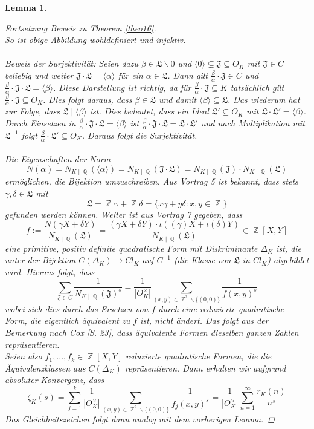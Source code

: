 \documentclass[10pt,a4paper]{article}
\theoremstyle{plain}
\newtheorem{lem}[thm]{Lemma}
\theoremstyle{definition}
\theoremstyle{remark}
\DeclareMathOperator{\Q}{\mathbb{Q}}
\DeclareMathOperator{\Z}{\mathbb{Z}}
\begin{document}
\begin{lem}
\begin{proof}[Fortsetzung Beweis zu Theorem \ref{theo16}]
\\
So ist obige Abbildung wohldefiniert und injektiv.\\
\\
Beweis der Surjektivität:
Seien dazu $\beta \in \mathfrak{L}\backslash{0}$ und  $\langle 0 \rangle \subsetneq \mathfrak{J} \subseteq O_K$ mit $\mathfrak{J} \in C$ beliebig und weiter $\mathfrak{J\cdot L}= \langle \alpha \rangle$ für ein $\alpha \in \mathfrak{L}$. Dann gilt $\frac{\beta}{\alpha} \cdot \mathfrak{J} \in C$ und $\frac{\beta}{\alpha} \cdot \mathfrak{J\cdot L} = \langle \beta\rangle$. Diese Darstellung ist richtig, da für $\frac{\beta}{\alpha} \cdot \mathfrak{J} \subseteq K$ tatsächlich gilt $\frac{\beta}{\alpha} \cdot \mathfrak{J} \subseteq O_K$. Dies folgt daraus, dass $\beta \in \mathfrak{L}$ und damit $\langle \beta \rangle \subseteq \mathfrak{L}$. Das wiederum hat zur Folge, dass $\mathfrak{L}\mid \langle \beta \rangle$ ist. Dies bedeutet, dass ein Ideal $\mathfrak{L'}\subseteq O_K$ mit $\mathfrak{L\cdot L'}= \langle \beta \rangle$. Durch Einsetzen in $\frac{\beta}{\alpha} \cdot \mathfrak{J\cdot L} = \langle \beta\rangle$ ist $\frac{\beta}{\alpha} \cdot \mathfrak{J\cdot L} = \mathfrak{L \cdot L'} $ und nach Multiplikation mit $\mathfrak{L^{-1}}$ folgt $\frac{\beta}{\alpha} \cdot \mathfrak{L'}\subseteq O_K$. Daraus folgt die Surjektivität.\\
\\
Die Eigenschaften der Norm $$N(\alpha)= N_{K\mid \Q}(\langle \alpha \rangle)=N_{K\mid \Q}(\mathfrak{J\cdot L})=N_{K\mid \Q}(\mathfrak{J})\cdot N_{K\mid \Q}(\mathfrak{L})$$ ermöglichen, die Bijektion umzuschreiben. Aus Vortrag 5 ist bekannt, dass stets $\gamma, \delta \in \mathfrak{L}$ mit $$\mathfrak{L}= \Z\gamma+\Z\delta = \{x\gamma+y\delta\colon x,y \in \Z\}$$ gefunden werden können. Weiter ist aus Vortrag 7 gegeben, dass $$f:=\frac{N(\gamma X+\delta Y)}{N_{K\mid \Q}(\mathfrak{L})}=\frac{(\gamma X + \delta Y)\cdot \iota((\gamma)X+\iota(\delta)Y)}{N_{K\mid \Q}(\mathfrak{L})} \in \Z[X,Y]$$eine primitive, positiv definite quadratische Form mit Diskriminante $\Delta_K$ ist, die unter der Bijektion $C(\Delta_K)\rightarrow Cl_K$ auf $C^{-1}$ (die Klasse von $\mathfrak{L}$ in $Cl_K$) abgebildet wird. Hieraus folgt, dass $$\sum_{\mathfrak{J}\in C}\frac{1}{N_{K\mid \Q }(\mathfrak{J})^s}=\frac{1}{|O_K^{\times}|}\sum_{(x,y)\in \Z^2\backslash \{ (0,0)\}}\frac{1}{f(x,y)^s}$$wobei sich dies durch das Ersetzen von $f$ durch eine reduzierte quadratische Form, die eigentlich äquivalent zu $f$ ist, nicht ändert. Das folgt aus der Bemerkung nach Cox \cite{Cox}[S. 23], dass äquivalente Formen dieselben ganzen Zahlen repräsentieren.
\\
Seien also $f_1,...,f_k \in \Z[X,Y]$ reduzierte quadratische Formen, die die Äquivalenzklassen aus $C(\Delta_K)$ repräsentieren. Dann erhalten wir aufgrund absoluter Konvergenz, dass $$\zeta_K(s) = \sum_{j=1}^{k}\frac{1}{|O_K^{\times}|}\sum_{(x,y) \in \Z^2 \backslash \{(0,0)\}}\frac{1}{f_j(x,y)^s}=\frac{1}{|O_K^{\times}|}\sum_{n=1}^{\infty}\frac{r_K(n)}{n^s}$$
Das Gleichheitszeichen folgt dann analog mit dem vorherigen Lemma.
\end{proof}
\end{lem}
 
\end{document}
